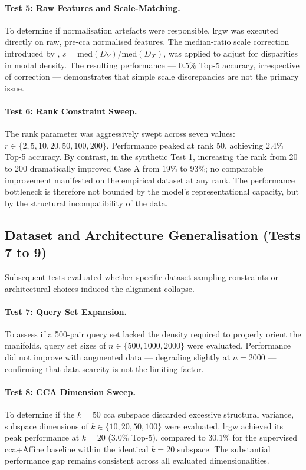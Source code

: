 \paragraph{Test 5: Raw Features and Scale-Matching.}
To determine if normalisation artefacts were responsible, \gls{lrgw} was executed directly on raw, pre-\gls{cca} normalised features. The median-ratio scale correction introduced by \textcite{li2026scale}, $s = \text{med}(D_Y)/\text{med}(D_X)$, was applied to adjust for disparities in modal density. The resulting performance --- $0.5\%$ Top-5 accuracy, irrespective of correction --- demonstrates that simple scale discrepancies are not the primary issue.

\paragraph{Test 6: Rank Constraint Sweep.}
The rank parameter was aggressively swept across seven values: $r \in \{2, 5, 10, 20, 50, 100, 200\}$. Performance peaked at rank 50, achieving $2.4\%$ Top-5 accuracy. By contrast, in the synthetic Test 1, increasing the rank from 20 to 200 dramatically improved Case A from $19\%$ to $93\%$; no comparable improvement manifested on the empirical dataset at any rank. The performance bottleneck is therefore not bounded by the model's representational capacity, but by the structural incompatibility of the data.

\subsection{Dataset and Architecture Generalisation (Tests 7 to 9)}
\label{subsec:dataset_generalization}

Subsequent tests evaluated whether specific dataset sampling constraints or architectural choices induced the alignment collapse.

\paragraph{Test 7: Query Set Expansion.}
To assess if a 500-pair query set lacked the density required to properly orient the manifolds, query set sizes of $n \in \{500, 1000, 2000\}$ were evaluated. Performance did not improve with augmented data --- degrading slightly at $n=2000$ --- confirming that data scarcity is not the limiting factor.

\paragraph{Test 8: CCA Dimension Sweep.}
To determine if the $k=50$ \gls{cca} subspace discarded excessive structural variance, subspace dimensions of $k \in \{10, 20, 50, 100\}$ were evaluated. \gls{lrgw} achieved its peak performance at $k=20$ ($3.0\%$ Top-5), compared to $30.1\%$ for the supervised \gls{cca}+Affine baseline within the identical $k=20$ subspace. The substantial performance gap remains consistent across all evaluated dimensionalities.

